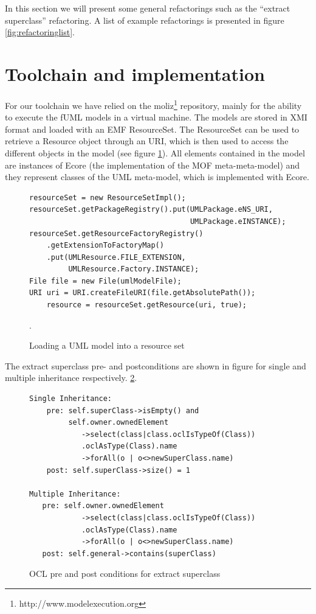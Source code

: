 \documentclass{llncs}
\begin{document}
In this section we will present some general refactorings such as the ``extract superclass'' 
refactoring. A list of example refactorings is presented in figure \ref{fig:refactoringlist}.

\section{Toolchain and implementation}
\label{sec:toolchain}
For our toolchain we have relied on the moliz\footnote{http://www.modelexecution.org} repository, mainly for the ability to execute the fUML 
models in a virtual machine. The models are stored in XMI format and loaded with an EMF ResourceSet. The ResourceSet
can be used to retrieve a Resource object through an URI, which is then used to access the different objects in the model 
(see figure \ref{lst:resourceset}). All elements contained in the model are instances of Ecore (the implementation of
the MOF meta-meta-model) and they represent classes of the UML meta-model, which is implemented with Ecore.

\begin{figure}
 \begin{lstlisting}
resourceSet = new ResourceSetImpl();
resourceSet.getPackageRegistry().put(UMLPackage.eNS_URI,
                                     UMLPackage.eINSTANCE);
resourceSet.getResourceFactoryRegistry()
    .getExtensionToFactoryMap()
    .put(UMLResource.FILE_EXTENSION,
         UMLResource.Factory.INSTANCE);
File file = new File(umlModelFile);
URI uri = URI.createFileURI(file.getAbsolutePath());
    resource = resourceSet.getResource(uri, true);
 \end{lstlisting}
 \caption{Loading a UML model into a resource set}.
 \label{lst:resourceset}
\end{figure}

The extract superclass pre- and postconditions are shown in figure for single and multiple inheritance respectively.
\ref{lst:oclsuperclass}.

\begin{figure}[h!t]
 \begin{lstlisting}
Single Inheritance:
    pre: self.superClass->isEmpty() and 
         self.owner.ownedElement
            ->select(class|class.oclIsTypeOf(Class))
            .oclAsType(Class).name
            ->forAll(o | o<>newSuperClass.name)
    post: self.superClass->size() = 1

Multiple Inheritance:
   pre: self.owner.ownedElement
            ->select(class|class.oclIsTypeOf(Class))
            .oclAsType(Class).name
            ->forAll(o | o<>newSuperClass.name)
   post: self.general->contains(superClass)
 \end{lstlisting}
 \caption{OCL pre and post conditions for extract superclass}
 \label{lst:oclsuperclass}
\end{figure}
\end{document}
